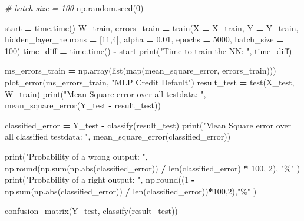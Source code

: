 \documentclass[
]{book}
\newenvironment{Shaded}{\begin{snugshade}}{\end{snugshade}}
\newcommand{\BuiltInTok}[1]{#1}
\newcommand{\CommentTok}[1]{\textcolor[rgb]{0.56,0.35,0.01}{\textit{#1}}}
\newcommand{\DecValTok}[1]{\textcolor[rgb]{0.00,0.00,0.81}{#1}}
\newcommand{\FloatTok}[1]{\textcolor[rgb]{0.00,0.00,0.81}{#1}}
\newcommand{\NormalTok}[1]{#1}
\newcommand{\OperatorTok}[1]{\textcolor[rgb]{0.81,0.36,0.00}{\textbf{#1}}}
\newcommand{\StringTok}[1]{\textcolor[rgb]{0.31,0.60,0.02}{#1}}
\begin{document}
\begin{Shaded}
\begin{Highlighting}[]
\CommentTok{\# batch size = 100}
\NormalTok{np.random.seed(}\DecValTok{0}\NormalTok{)}

\NormalTok{start }\OperatorTok{=}\NormalTok{ time.time()}
\NormalTok{W\_train, errors\_train }\OperatorTok{=}\NormalTok{ train(X }\OperatorTok{=}\NormalTok{ X\_train, Y }\OperatorTok{=}\NormalTok{ Y\_train, hidden\_layer\_neurons }\OperatorTok{=}\NormalTok{ [}\DecValTok{11}\NormalTok{,}\DecValTok{4}\NormalTok{], alpha }\OperatorTok{=} \FloatTok{0.01}\NormalTok{, epochs }\OperatorTok{=} \DecValTok{5000}\NormalTok{, batch\_size }\OperatorTok{=} \DecValTok{100}\NormalTok{)}
\NormalTok{time\_diff }\OperatorTok{=}\NormalTok{ time.time() }\OperatorTok{{-}}\NormalTok{ start}
\BuiltInTok{print}\NormalTok{(}\StringTok{"Time to train the NN: "}\NormalTok{, time\_diff)}

\NormalTok{ms\_errors\_train }\OperatorTok{=}\NormalTok{ np.array(}\BuiltInTok{list}\NormalTok{(}\BuiltInTok{map}\NormalTok{(mean\_square\_error, errors\_train)))}
\NormalTok{plot\_error(ms\_errors\_train, }\StringTok{"MLP Credit Default"}\NormalTok{)}
\NormalTok{result\_test }\OperatorTok{=}\NormalTok{ test(X\_test, W\_train)}
\BuiltInTok{print}\NormalTok{(}\StringTok{"Mean Square error over all testdata: "}\NormalTok{, mean\_square\_error(Y\_test }\OperatorTok{{-}}\NormalTok{ result\_test))}

\NormalTok{classified\_error }\OperatorTok{=}\NormalTok{ Y\_test }\OperatorTok{{-}}\NormalTok{ classify(result\_test)}
\BuiltInTok{print}\NormalTok{(}\StringTok{"Mean Square error over all classified testdata: "}\NormalTok{, mean\_square\_error(classified\_error))}

\BuiltInTok{print}\NormalTok{(}\StringTok{"Probability of a wrong output: "}\NormalTok{, np.}\BuiltInTok{round}\NormalTok{(np.}\BuiltInTok{sum}\NormalTok{(np.}\BuiltInTok{abs}\NormalTok{(classified\_error)) }\OperatorTok{/} \BuiltInTok{len}\NormalTok{(classified\_error) }\OperatorTok{*} \DecValTok{100}\NormalTok{, }\DecValTok{2}\NormalTok{), }\StringTok{"\%"}\NormalTok{ )}
\BuiltInTok{print}\NormalTok{(}\StringTok{"Probability of a right output: "}\NormalTok{, np.}\BuiltInTok{round}\NormalTok{((}\DecValTok{1} \OperatorTok{{-}}\NormalTok{ np.}\BuiltInTok{sum}\NormalTok{(np.}\BuiltInTok{abs}\NormalTok{(classified\_error)) }\OperatorTok{/} \BuiltInTok{len}\NormalTok{(classified\_error))}\OperatorTok{*}\DecValTok{100}\NormalTok{,}\DecValTok{2}\NormalTok{),}\StringTok{"\%"}\NormalTok{ )}


\NormalTok{confusion\_matrix(Y\_test, classify(result\_test))}
\end{Highlighting}
\end{Shaded}
\end{document}
